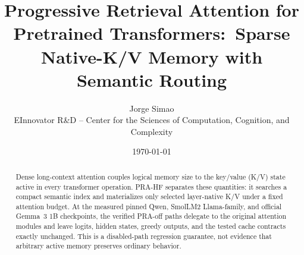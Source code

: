 \documentclass[11pt]{article}
\title{Progressive Retrieval Attention for Pretrained Transformers:\
Sparse Native-K/V Memory with Semantic Routing}
\author{Jorge Simao\\EInnovator R\&D -- Center for the Sciences of Computation, Cognition, and Complexity}
\date{\today}
\begin{document}
\maketitle

\begin{abstract}
Dense long-context attention couples logical memory size to the key/value (K/V) state active in
every transformer operation. PRA-HF separates these quantities: it searches a compact semantic
index and materializes only selected layer-native K/V under a fixed attention budget. At the
measured pinned Qwen, SmolLM2 Llama-family, and official Gemma~3 1B checkpoints, the verified
PRA-off paths delegate to the original attention modules and leave logits, hidden states, greedy
outputs, and the tested cache contracts exactly unchanged. This is a disabled-path regression
guarantee, not evidence that arbitrary active memory preserves ordinary behavior.


\end{abstract}
\end{document}
